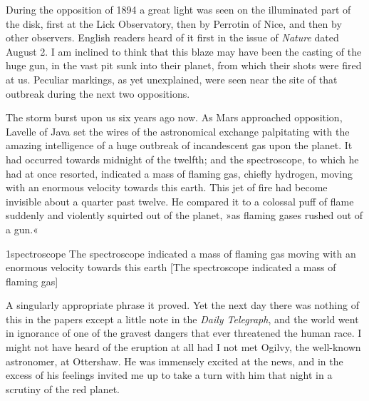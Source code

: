 During the opposition of 1894 a great light was seen on the illuminated part of the disk, first at the Lick Observatory, then by Perrotin of Nice, and then by other observers. English readers heard of it first in the issue of \textit{Nature} dated August 2. I am inclined to think that this blaze may have been the casting of the huge gun, in the vast pit sunk into their planet, from which their shots were fired at us. Peculiar markings, as yet unexplained, were seen near the site of that outbreak during the next two oppositions.

The storm burst upon us six years ago now. As Mars approached opposition, Lavelle of Java set the wires of the astronomical exchange palpitating with the amazing intelligence of a huge outbreak of incandescent gas upon the planet. It had occurred towards midnight of the twelfth; and the spectroscope, to which he had at once resorted, indicated a mass of flaming gas, chiefly hydrogen, moving with an enormous velocity towards this earth. This jet of fire had become invisible about a quarter past twelve. He compared it to a colossal puff of flame suddenly and violently squirted out of the planet, »as flaming gases rushed out of a gun.«

% 
 

\begin{bwbigpic}
	[1.2] 
	{1spectroscope} 
	{The spectroscope indicated a mass of flaming gas moving with an enormous velocity towards this earth} 
	[The spectroscope indicated a mass of flaming gas]
\end{bwbigpic}

A singularly appropriate phrase it proved. Yet the next day there was nothing of this in the papers except a little note in the \textit{Daily Telegraph}, and the world went in ignorance of one of the gravest dangers that ever threatened the human race. I might not have heard of the eruption at all had I not met Ogilvy, the well-known astronomer, at Ottershaw. He was immensely excited at the news, and in the excess of his feelings invited me up to take a turn with him that night in a scrutiny of the red planet.

